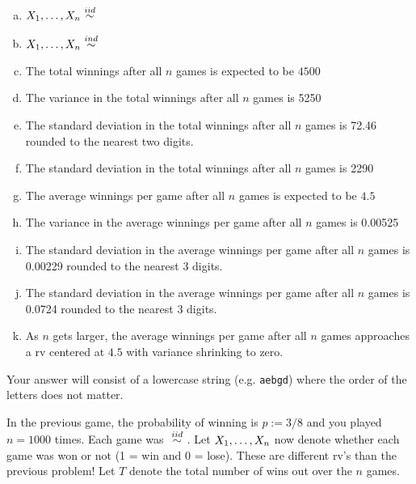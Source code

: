 \documentclass[12pt,landscape]{article}
\newcommand{\instr}{\small Your answer will consist of a lowercase string (e.g. \texttt{aebgd}) where the order of the letters does not matter. \normalsize}
\begin{document}
\vspace{-0.2cm}\benum{} 
\begin{enumerate}[(a)]
\item $\Xoneton \iid$
\item $\Xoneton \inddist$

\item The total winnings after all $n$ games is expected to be $4500$
\item The variance in the total winnings after all $n$ games is 5250
\item The standard deviation in the total winnings after all $n$ games is 72.46 rounded to the nearest two digits.
\item The standard deviation in the total winnings after all $n$ games is 2290

\item The average winnings per game after all $n$ games is expected to be $4.5$
\item The variance in the average winnings per game after all $n$ games is 0.00525
\item The standard deviation in the average winnings per game after all $n$ games is 0.00229 rounded to the nearest 3 digits.
\item The standard deviation in the average winnings per game after all $n$ games is 0.0724 rounded to the nearest 3 digits.
\item As $n$ gets larger, the average winnings per game after all $n$ games approaches a rv centered at $4.5$ with variance shrinking to zero.
\end{enumerate}
\eenum\instr\pagebreak


\problem{} In the previous game, the probability of winning is $p := 3/8$ and you played $n = 1000$ times. Each game was $\iid$. Let $X_1, \ldots, X_n$ now denote whether each game was won or not (1 = win and 0 = lose). These are different rv's than the previous problem! Let $T$ denote the total number of wins out over the $n$ games.
\end{document}
